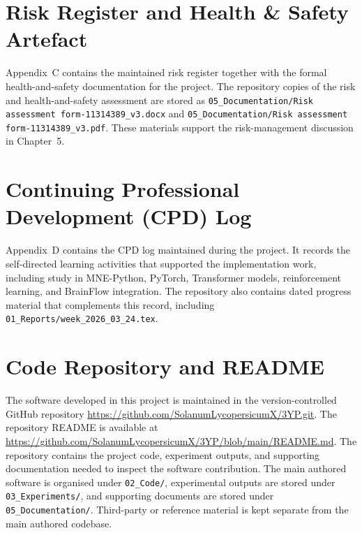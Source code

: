 \documentclass[12pt, a4paper]{article}
\begin{document}


\section{Risk Register and Health \& Safety Artefact}

Appendix~C contains the maintained risk register together with the formal health-and-safety documentation for the project. The repository copies of the risk and health-and-safety assessment are stored as \texttt{05\_Documentation/Risk assessment form-11314389\_v3.docx} and \texttt{05\_Documentation/Risk assessment form-11314389\_v3.pdf}. These materials support the risk-management discussion in Chapter~5.



\section{Continuing Professional Development (CPD) Log}

Appendix~D contains the CPD log maintained during the project. It records the self-directed learning activities that supported the implementation work, including study in MNE-Python, PyTorch, Transformer models, reinforcement learning, and BrainFlow integration. The repository also contains dated progress material that complements this record, including \texttt{01\_Reports/week\_2026\_03\_24.tex}.



\section{Code Repository and README}

The software developed in this project is maintained in the version-controlled GitHub repository \url{https://github.com/SolanumLycopersicumX/3YP.git}. The repository README is available at \url{https://github.com/SolanumLycopersicumX/3YP/blob/main/README.md}. The repository contains the project code, experiment outputs, and supporting documentation needed to inspect the software contribution. The main authored software is organised under \texttt{02\_Code/}, experimental outputs are stored under \texttt{03\_Experiments/}, and supporting documents are stored under \texttt{05\_Documentation/}. Third-party or reference material is kept separate from the main authored codebase.
\end{document}
